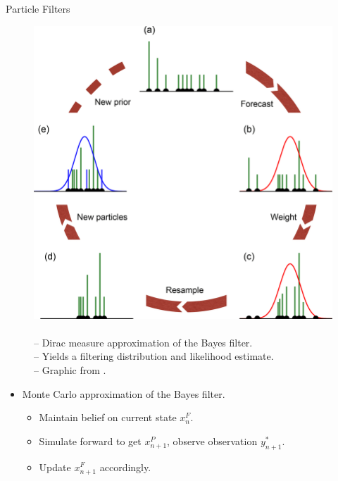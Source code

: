 \documentclass{beamer}
\begin{document}
\begin{frame}{Particle Filters}

    \begin{figure}
        \centering
        \begin{minipage}[c]{0.5\textwidth}
            \centering
            \includegraphics[scale=0.15]{imgs/pfilter.png}
            \end{minipage}
        \begin{minipage}[c]{0.45\textwidth}
            \caption{
            \\
            -- Dirac measure approximation of the Bayes filter. 
            \\ 
            -- Yields a filtering distribution and likelihood estimate.
            \\ 
            -- Graphic from \cite{berg2019pfilterimage}.}
        \end{minipage}
        \label{fig:pfilter-illustration}
    \end{figure}
    
    \begin{itemize}
        \item Monte Carlo approximation of the Bayes filter.
        \begin{itemize}
            \item \pause Maintain belief on current state $x_n^F$. 
            \item \pause Simulate forward to get $x_{n+1}^P$, observe observation $y_{n+1}^*$.
            \item \pause Update $x_{n+1}^F$ accordingly.
        \end{itemize}
    \end{itemize}
\end{frame}
\end{document}
